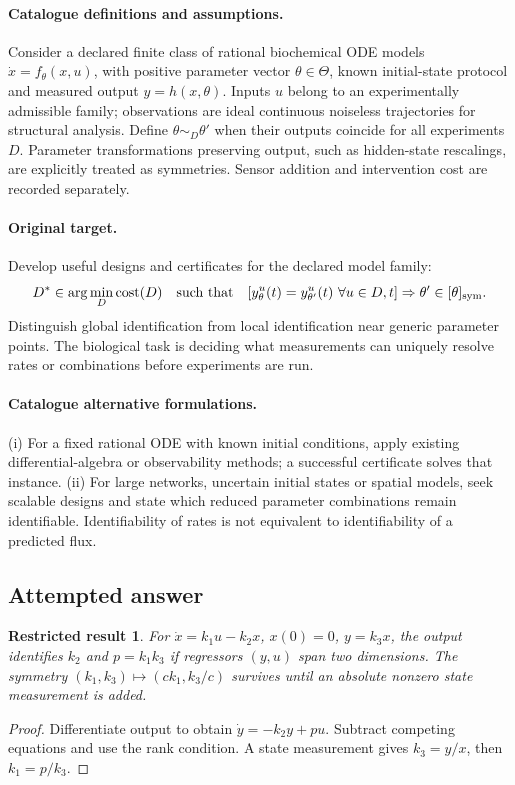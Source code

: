 \documentclass[11pt]{article}
\newtheorem{attemptresult}{Restricted result}[section]
\begin{document}
\paragraph{Catalogue definitions and assumptions.}
Consider a declared finite class of rational biochemical ODE models $\dot x=f_\theta(x,u)$, with positive parameter vector $\theta\in\Theta$, known initial-state protocol and measured output $y=h(x,\theta)$. Inputs $u$ belong to an experimentally admissible family; observations are ideal continuous noiseless trajectories for structural analysis. Define $\theta\sim_D\theta'$ when their outputs coincide for all experiments $D$. Parameter transformations preserving output, such as hidden-state rescalings, are explicitly treated as symmetries. Sensor addition and intervention cost are recorded separately.
\paragraph{Original target.}
Develop useful designs and certificates for the declared model family:
\[
D^*\in\arg\min_D\mathrm{cost}(D)
\quad\text{such that}\quad
[y_\theta^u(t)=y_{\theta'}^u(t)\ \forall u\in D,t]\Rightarrow\theta'\in[\theta]_{\rm sym}.
\]
Distinguish global identification from local identification near generic parameter points. The biological task is deciding what measurements can uniquely resolve rates or combinations before experiments are run.
\paragraph{Catalogue alternative formulations.}
(i) For a fixed rational ODE with known initial conditions, apply existing differential-algebra or observability methods; a successful certificate solves that instance. (ii) For large networks, uncertain initial states or spatial models, seek scalable designs and state which reduced parameter combinations remain identifiable. Identifiability of rates is not equivalent to identifiability of a predicted flux.
\subsection{Attempted answer}
\begin{attemptresult}
For $\dot x=k_1u-k_2x$, $x(0)=0$, $y=k_3x$, the output identifies $k_2$ and $p=k_1k_3$ if regressors $(y,u)$ span two dimensions. The symmetry $(k_1,k_3)\mapsto(ck_1,k_3/c)$ survives until an absolute nonzero state measurement is added.
\end{attemptresult}
\begin{proof}
Differentiate output to obtain $\dot y=-k_2y+pu$. Subtract competing equations and use the rank condition. A state measurement gives $k_3=y/x$, then $k_1=p/k_3$.
\end{proof}
\end{document}
